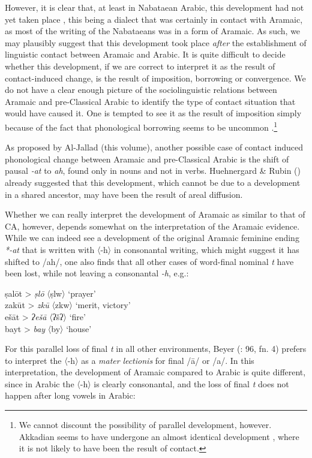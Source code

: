 \documentclass[output=paper]{langsci/langscibook}
\begin{document}
However, it is clear that, at least in Nabataean Arabic, this development had not yet taken place \citep[91--93]{Diem1980}, this being a dialect that was certainly in contact with Aramaic, as most of the writing of the Nabataeans was in a form of Aramaic. As such, we may plausibly suggest that this development took place \textit{after} the establishment of linguistic contact between Aramaic and Arabic. It is quite difficult to decide whether this development, if we are correct to interpret it as the result of contact-induced change, is the result of imposition, borrowing or convergence. We do not have a clear enough picture of the sociolinguistic relations between Aramaic and pre-Classical Arabic to identify the type of contact situation that would have caused it. One is tempted to see it as the result of imposition simply because of the fact that phonological borrowing seems to be uncommon \citep[526]{Lucas2015}.\footnote{We cannot discount the possibility of parallel development, however. Akkadian seems to have undergone an almost identical development \citep[196]{Huehnergard1997}, where it is not likely to have been the result of contact.} 

As proposed by Al-Jallad (this volume), another possible case of contact induced phonological change between Aramaic and pre-Classical Arabic is the shift of pausal \textit{-at} to \textit{ah}, found only in nouns and not in verbs. Huehnergard \& Rubin (\citeyear[267--268]{HuehnergardRubin2011}) already suggested that this development, which cannot be due to a development in a shared ancestor, may have been the result of areal diffusion.

Whether we can really interpret the development of Aramaic as similar to that of CA, however, depends somewhat on the interpretation of the Aramaic evidence. While we can indeed see a development of the original Aramaic feminine ending \textit{*-at} that is written with 〈-h〉 in consonantal writing, which might suggest it has shifted to /ah/, one also finds that all other cases of word-final nominal \textit{t} have been lost, while not leaving a consonantal \textit{-h}, e.g.: 

\ea
\ea *ṣalōt > \textit{ṣlō} 〈ṣlw〉 ‘prayer’\\
\ex *zakūt > \textit{zkū} 〈zkw〉 ‘merit, victory’\\
\ex *ešāt > \textit{ʔešā} 〈ʔšʔ〉 ‘fire’\\
\ex *bayt > \textit{bay}  〈by〉 ‘house’
\z
\z

For this parallel loss of final \textit{t} in all other environments, Beyer (\citeyear{Beyer1984}: 96, fn. 4) prefers to interpret the 〈-h〉 as a \textit{mater} \textit{lectionis} for final /ā/ or /a/. In this interpretation, the development of Aramaic compared to Arabic is quite different, since in Arabic the 〈-h〉 is clearly consonantal, and the loss of final \textit{t} does not happen after long vowels in Arabic:
\end{document}
